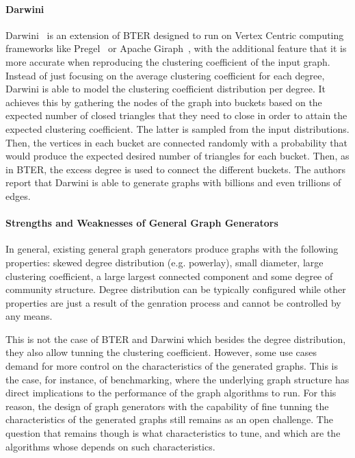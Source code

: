 \paragraph{Darwini} Darwini~\cite{edunov2016darwini} is an extension of BTER
designed to run on Vertex Centric computing frameworks like
Pregel~\cite{malewicz2010pregel} or Apache Giraph~\cite{ching2015one}, with the
additional feature that it is more accurate when reproducing the clustering
coefficient of the input graph. Instead of just focusing on the average
clustering coefficient for each degree, Darwini is able to model the clustering
coefficient distribution per degree. It achieves this by gathering the nodes
of the graph into buckets based on the expected number of closed triangles that they need
to close in order to attain the expected clustering coefficient. The latter is
sampled from the input distributions. Then, the vertices in each bucket are
connected randomly with a probability that would produce the expected
desired number of triangles for each bucket. Then, as in BTER, the excess degree
is used to connect the different buckets. The authors report that Darwini is
able to generate graphs with billions and even trillions of edges.


\paragraph{Strengths and Weaknesses of General Graph Generators}
In general, existing general graph generators produce graphs with the following
properties: skewed degree distribution (e.g. powerlay), small diameter, large
clustering coefficient, a large largest connected component and some degree of
community structure. Degree distribution can be typically configured while other
properties are just a result of the genration process and cannot be controlled
by any means. 

This is not the case of BTER and Darwini which besides the degree distribution,
they also allow tunning the clustering coefficient. However, some use cases
demand for more control on the characteristics of the generated graphs.
This is the case, for instance, of benchmarking, where the underlying graph
structure has direct implications to the performance of the graph algorithms
to run. For this reason, the design of graph generators with the capability of fine
tunning the characteristics of the generated graphs still remains as an open
challenge. The question that remains though is what characteristics to tune,
and which are the algorithms whose depends on such characteristics. 
